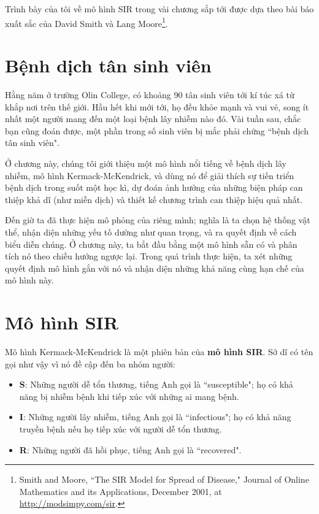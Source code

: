 \documentclass[12pt, openany]{book}
\theoremstyle{exercise}
\begin{document}

Trình bày của tôi về mô hình SIR trong vài chương sắp tới được dựa theo bài báo xuất sắc của David Smith và Lang Moore\footnote{Smith and Moore, ``The SIR Model for Spread of Disease," Journal of Online Mathematics and its Applications, December 2001, at \url{http://modsimpy.com/sir}.}.



\section{Bệnh dịch tân sinh viên}

Hằng năm ở trường Olin College, có khoảng 90 tân sinh viên tới kí túc xá từ khắp nơi trên thế giới. Hầu hết khi mới tới, họ đều khỏe mạnh và vui vẻ, song ít nhất một người mang đến một loại bệnh lây nhiễm nào đó. Vài tuần sau, chắc bạn cũng đoán được, một phần trong số sinh viên bị mắc phải chứng ``bệnh dịch tân sinh viên".


Ở chương này, chúng tôi giới thiệu một mô hình nổi tiếng về bệnh dịch lây nhiễm, mô hình Kermack-McKendrick, và dùng nó để giải thích sự tiến triển bệnh dịch trong suốt một học kì, dự đoán ảnh hưởng của những biện pháp can thiệp khả dĩ (như miễn dịch) và thiết kế chương trình can thiệp hiệu quả nhất.


Đến giờ ta đã thực hiện mô phỏng của riêng mình; nghĩa là ta chọn hệ thống vật thể, nhận diện những yếu tố dường như quan trọng, và ra quyết định về cách biểu diễn chúng. Ở chương này, ta bắt đầu bằng một mô hình sẵn có và phân tích nó theo chiều hướng ngược lại. Trong quá trình thực hiện, ta xét những quyết định mô hình gắn với nó và nhận diện những khả năng cùng hạn chế của mô hình này.


\section{Mô hình SIR}

Mô hình Kermack-McKendrick là một phiên bản của {\bf mô hình SIR}. Sở dĩ có tên gọi như vậy vì nó đề cập đến ba nhóm người:

\begin{itemize}

\item {\bf S}: Những người dễ tổn thương, tiếng Anh gọi là ``susceptible"; họ có khả năng bị nhiễm bệnh khi tiếp xúc với những ai mang bệnh.

\item {\bf I}: Những người lây nhiễm, tiếng Anh gọi là ``infectious"; họ có khả năng truyền bệnh nếu họ tiếp xúc với người dễ tổn thương.

\item {\bf R}: Những người đã hồi phục, tiếng Anh gọi là ``recovered".

\end{itemize}
\end{document}
